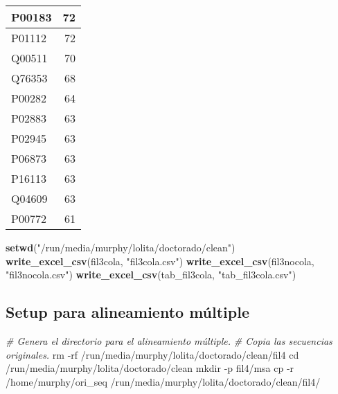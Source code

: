 \documentclass[
]{book}
\newenvironment{Shaded}{\begin{snugshade}}{\end{snugshade}}
\newcommand{\BuiltInTok}[1]{#1}
\newcommand{\CommentTok}[1]{\textcolor[rgb]{0.56,0.35,0.01}{\textit{#1}}}
\newcommand{\FunctionTok}[1]{\textcolor[rgb]{0.00,0.00,0.00}{#1}}
\newcommand{\KeywordTok}[1]{\textcolor[rgb]{0.13,0.29,0.53}{\textbf{#1}}}
\newcommand{\NormalTok}[1]{#1}
\newcommand{\StringTok}[1]{\textcolor[rgb]{0.31,0.60,0.02}{#1}}
\begin{document}
\begin{table}[H]
\begin{tabular}{l|r}
\hline
P00183 & 72\\
\hline
P01112 & 72\\
\hline
Q00511 & 70\\
\hline
Q76353 & 68\\
\hline
P00282 & 64\\
\hline
P02883 & 63\\
\hline
P02945 & 63\\
\hline
P06873 & 63\\
\hline
P16113 & 63\\
\hline
Q04609 & 63\\
\hline
P00772 & 61\\
\hline
\end{tabular}
\end{table}

\begin{Shaded}
\begin{Highlighting}[]
\KeywordTok{setwd}\NormalTok{(}\StringTok{"/run/media/murphy/lolita/doctorado/clean"}\NormalTok{)}
\KeywordTok{write\_excel\_csv}\NormalTok{(fil3cola, }\StringTok{"fil3cola.csv"}\NormalTok{)}
\KeywordTok{write\_excel\_csv}\NormalTok{(fil3nocola, }\StringTok{"fil3nocola.csv"}\NormalTok{)}
\KeywordTok{write\_excel\_csv}\NormalTok{(tab\_fil3cola, }\StringTok{"tab\_fil3cola.csv"}\NormalTok{)}
\end{Highlighting}
\end{Shaded}

\hypertarget{setup-para-alineamiento-muxfaltiple}{%
\subsection{Setup para alineamiento múltiple}\label{setup-para-alineamiento-muxfaltiple}}

\begin{Shaded}
\begin{Highlighting}[]
\CommentTok{\# Genera el directorio para el alineamiento múltiple.}
\CommentTok{\# Copia las secuencias originales.}
\FunctionTok{rm}\NormalTok{ {-}rf /run/media/murphy/lolita/doctorado/clean/fil4}
\BuiltInTok{cd}\NormalTok{ /run/media/murphy/lolita/doctorado/clean}
\FunctionTok{mkdir}\NormalTok{ {-}p fil4/msa}
\FunctionTok{cp}\NormalTok{ {-}r /home/murphy/ori\_seq /run/media/murphy/lolita/doctorado/clean/fil4/}
\end{Highlighting}
\end{Shaded}
\end{document}
